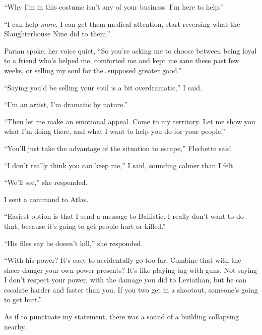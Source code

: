 ``Why I'm in this costume isn't any of your business.  I'm here to help.''



``I can help \emph{more}.  I can get them medical attention, start reversing what the Slaughterhouse Nine did to them.''



Parian spoke, her voice quiet, ``So you're asking me to choose between being loyal to a friend who's helped me, comforted me and kept me sane these past few weeks, or selling my soul for the\ldots supposed greater good.''



``Saying you'd be selling your soul is a bit overdramatic,'' I said.



``I'm an artist, I'm dramatic by nature.''



``Then let me make an emotional appeal.  Come to my territory.  Let me show you what I'm doing there, and what I want to help you do for your people.''



``You'll just take the advantage of the situation to escape,'' Flechette said.



``I don't really think you can keep me,'' I said, sounding calmer than I felt.



``We'll see,'' she responded.



I sent a command to Atlas.



``Easiest option is that I send a message to Ballistic.  I really don't want to do that, because it's going to get people hurt or killed.''



``His files say he doesn't kill,'' she responded.



``With his power?  It's easy to accidentally go too far.  Combine that with the sheer danger your own power presents?  It's like playing tag with guns.  Not saying I don't respect your power, with the damage you did to Leviathan, but he can escalate harder and faster than you.  If you two get in a shootout, someone's going to get hurt.''



As if to punctuate my statement, there was a sound of a building collapsing nearby.



